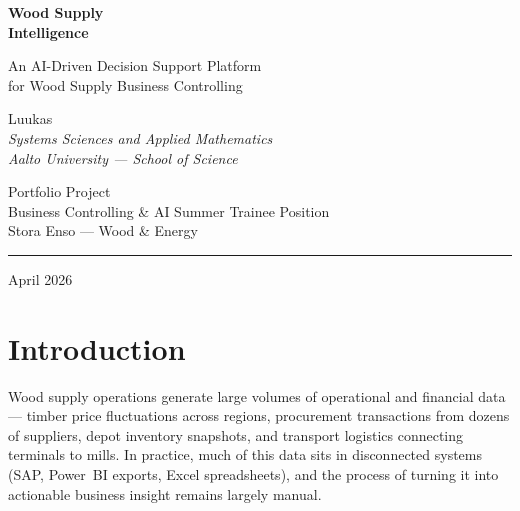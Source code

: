 \documentclass[11pt,a4paper]{article}
\begin{document}
\begin{titlepage}
\centering
\vspace*{3cm}

{\fontsize{36}{40}\selectfont\bfseries\color{forestdark} Wood Supply\\[0.2em] Intelligence}

\vspace{1cm}

{\Large\color{storagreen} An AI-Driven Decision Support Platform\\for Wood Supply Business Controlling}

\vspace{2cm}

{\large
Luukas\\[0.3em]
\textit{Systems Sciences and Applied Mathematics}\\
\textit{Aalto University --- School of Science}
}

\vspace{1.5cm}

{\normalsize
Portfolio Project\\
Business Controlling \& AI Summer Trainee Position\\
Stora Enso --- Wood \& Energy
}

\vspace{2cm}

\textcolor{pinegr}{\rule{8cm}{1pt}}

\vspace{0.5cm}
{\small April 2026}

\end{titlepage}

\tableofcontents
\newpage

\section{Introduction}

Wood supply operations generate large volumes of operational and financial data --- timber price fluctuations across regions, procurement transactions from dozens of suppliers, depot inventory snapshots, and transport logistics connecting terminals to mills. In practice, much of this data sits in disconnected systems (SAP, Power~BI exports, Excel spreadsheets), and the process of turning it into actionable business insight remains largely manual.
\end{document}
